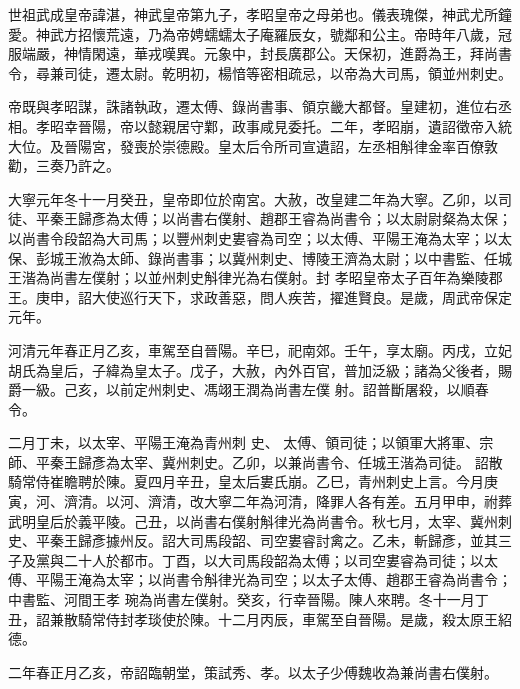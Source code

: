 
\begin{pinyinscope}

 世祖武成皇帝諱湛，神武皇帝第九子，孝昭皇帝之母弟也。儀表瑰傑，神武尤所鐘愛。神武方招懷荒遠，乃為帝娉蠕蠕太子庵羅辰女，號鄰和公主。帝時年八歲，冠服端嚴，神情閑遠，華戎嘆異。元象中，封長廣郡公。天保初，進爵為王，拜尚書令，尋兼司徒，遷太尉。乾明初，楊愔等密相疏忌，以帝為大司馬，領並州刺史。



 帝既與孝昭謀，誅諸執政，遷太傅、錄尚書事、領京畿大都督。皇建初，進位右丞相。孝昭幸晉陽，帝以懿親居守鄴，政事咸見委托。二年，孝昭崩，遺詔徵帝入統大位。及晉陽宮，發喪於崇德殿。皇太后令所司宣遺詔，左丞相斛律金率百僚敦勸，三奏乃許之。



 大寧元年冬十一月癸丑，皇帝即位於南宮。大赦，改皇建二年為大寧。乙卯，以司徒、平秦王歸彥為太傅；以尚書右僕射、趙郡王睿為尚書令；以太尉尉粲為太保；以尚書令段韶為大司馬；以豐州刺史婁睿為司空；以太傅、平陽王淹為太宰；以太保、彭城王浟為太師、錄尚書事；以冀州刺史、博陵王濟為太尉；以中書監、任城王湝為尚書左僕射；以並州刺史斛律光為右僕射。封
 孝昭皇帝太子百年為樂陵郡王。庚申，詔大使巡行天下，求政善惡，問人疾苦，擢進賢良。是歲，周武帝保定元年。



 河清元年春正月乙亥，車駕至自晉陽。辛巳，祀南郊。壬午，享太廟。丙戌，立妃胡氏為皇后，子緯為皇太子。戊子，大赦，內外百官，普加泛級；諸為父後者，賜爵一級。己亥，以前定州刺史、馮翊王潤為尚書左僕
 射。詔普斷屠殺，以順春令。



 二月丁未，以太宰、平陽王淹為青州刺
 史、
 太傅、領司徒；以領軍大將軍、宗師、平秦王歸彥為太宰、冀州刺史。乙卯，以兼尚書令、任城王湝為司徒。
 詔散騎常侍崔瞻聘於陳。夏四月辛丑，皇太后婁氏崩。乙巳，青州刺史上言。今月庚寅，河、濟清。以河、濟清，改大寧二年為河清，降罪人各有差。五月甲申，祔葬武明皇后於義平陵。己丑，以尚書右僕射斛律光為尚書令。秋七月，太宰、冀州刺史、平秦王歸彥據州反。詔大司馬段韶、司空婁睿討禽之。乙未，斬歸彥，並其三子及黨與二十人於都市。丁酉，以大司馬段韶為太傅；以司空婁睿為司徒；以太傅、平陽王淹為太宰；以尚書令斛律光為司空；以太子太傅、趙郡王睿為尚書令；中書監、河間王孝
 琬為尚書左僕射。癸亥，行幸晉陽。陳人來聘。冬十一月丁丑，詔兼散騎常侍封孝琰使於陳。十二月丙辰，車駕至自晉陽。是歲，殺太原王紹德。



 二年春正月乙亥，帝詔臨朝堂，策試秀、孝。以太子少傅魏收為兼尚書右僕射。




\end{pinyinscope}
